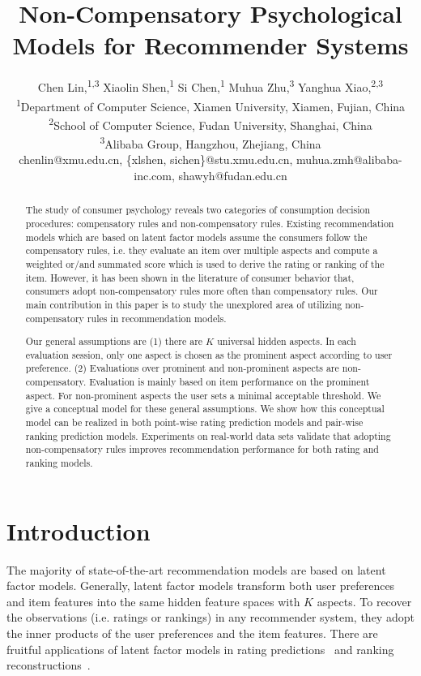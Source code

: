 \documentclass[letterpaper]{article} %
\title{Non-Compensatory Psychological Models for Recommender Systems}
\author{Chen Lin,\textsuperscript{\rm 1,\rm 3} Xiaolin Shen,\textsuperscript{\rm 1} Si Chen,\textsuperscript{\rm 1} Muhua Zhu,\textsuperscript{\rm 3} Yanghua Xiao,\textsuperscript{\rm 2,3}\\
\textsuperscript{\rm 1}Department of Computer Science, Xiamen University, Xiamen, Fujian, China\\
\textsuperscript{\rm 2}School of Computer Science, Fudan University, Shanghai, China \\
\textsuperscript{\rm 3}Alibaba Group, Hangzhou, Zhejiang, China\\
chenlin@xmu.edu.cn, \{xlshen, sichen\}@stu.xmu.edu.cn, muhua.zmh@alibaba-inc.com, shawyh@fudan.edu.cn}
\begin{document}
\maketitle
\begin{abstract}
The study of consumer psychology reveals two categories of consumption decision procedures: compensatory rules and non-compensatory rules. Existing recommendation models which are based on latent factor models assume the consumers follow the compensatory rules, i.e. they evaluate an item over multiple aspects and compute a weighted or/and summated score which is used to derive the rating or ranking of the item. However, it has been shown in the literature of consumer behavior that, consumers adopt non-compensatory rules more often than compensatory rules. Our main contribution in this paper is to study the unexplored area of utilizing non-compensatory rules in recommendation models. 

Our general assumptions are (1) there are $K$ universal hidden aspects. In each evaluation session, only one aspect is chosen as the prominent aspect according to user preference. (2) Evaluations over prominent and non-prominent aspects are non-compensatory. Evaluation is mainly based on item performance on the prominent aspect. For non-prominent aspects the user sets a minimal acceptable threshold. We give a conceptual model for these general assumptions. We show how this conceptual model can be realized in both point-wise rating prediction models and pair-wise ranking prediction models. Experiments on real-world data sets validate that adopting non-compensatory rules improves recommendation performance for both rating and ranking models.
\end{abstract}


\section{Introduction}\label{sec:introduction}
The majority of state-of-the-art recommendation models are based on latent factor models. Generally, latent factor models transform both user preferences and item features into the same hidden feature spaces with $K$ aspects. To recover the observations (i.e. ratings or rankings) in any recommender system, they adopt the inner products of the user preferences and the item features. There are fruitful applications of latent factor models in  rating predictions~\cite{Koren2009Matrix,Koren2010Factor,Lee2014Local} and ranking reconstructions~\cite{Rendle2009BPR,Steck2015Gaussian,Zhao2018Factored,Shi2010List}.   
\end{document}
